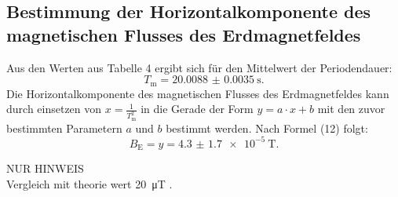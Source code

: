 \subsection{Bestimmung der Horizontalkomponente des magnetischen Flusses des Erdmagnetfeldes}

Aus den Werten aus Tabelle 4 ergibt sich für den Mittelwert der Periodendauer:
\begin{displaymath}
	T_\text{m} = \SI{20.0088(35)}{\second}\text{.}
\end{displaymath}
Die Horizontalkomponente des magnetischen Flusses des Erdmagnetfeldes kann durch einsetzen von $x=\frac{1}{T_\text{m}^2}$ in die Gerade der Form $y = a \cdot x +b$ mit den zuvor bestimmten Parametern $a$ und $b$ bestimmt werden. Nach Formel (12) folgt:
\begin{displaymath}
	B_\text{E} = y = \SI{ 4.3(17)e-5}{\tesla}\text{.}
\end{displaymath}

NUR HINWEIS\\
Vergleich mit theorie wert \SI{20}{\micro\tesla} \cite{Erdmagnetfeld}.
